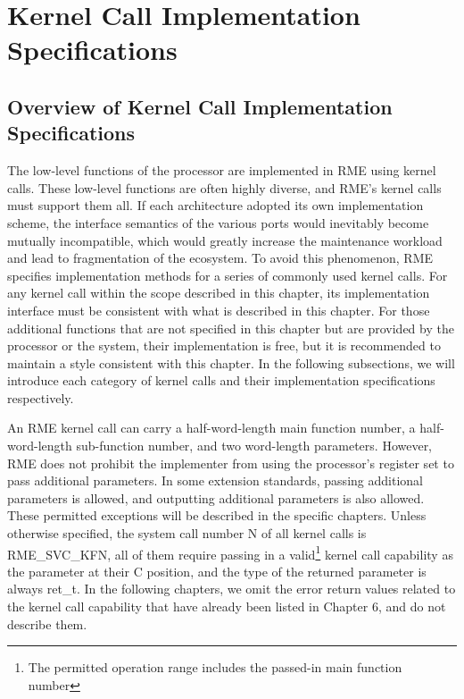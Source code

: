 \chapter{Kernel Call Implementation Specifications}\label{ch:kernel-call-implementation-specification}

\section{Overview of Kernel Call Implementation Specifications}\label{sec:8-kernel-call-implementation-overview}

The low-level functions of the processor are implemented in RME using kernel calls. These low-level functions are often highly diverse, and RME's kernel calls must support them all. If each architecture adopted its own implementation scheme, the interface semantics of the various ports would inevitably become mutually incompatible, which would greatly increase the maintenance workload and lead to fragmentation of the ecosystem. To avoid this phenomenon, RME specifies implementation methods for a series of commonly used kernel calls. For any kernel call within the scope described in this chapter, its implementation interface must be consistent with what is described in this chapter. For those additional functions that are not specified in this chapter but are provided by the processor or the system, their implementation is free, but it is recommended to maintain a style consistent with this chapter. In the following subsections, we will introduce each category of kernel calls and their implementation specifications respectively.

An RME kernel call can carry a half-word-length main function number, a half-word-length sub-function number, and two word-length parameters. However, RME does not prohibit the implementer from using the processor's register set to pass additional parameters. In some extension standards, passing additional parameters is allowed, and outputting additional parameters is also allowed. These permitted exceptions will be described in the specific chapters. Unless otherwise specified, the system call number N of all kernel calls is RME\_SVC\_KFN, all of them require passing in a valid\footnote{The permitted operation range includes the passed-in main function number} kernel call capability as the parameter at their C position, and the type of the returned parameter is always ret\_t. In the following chapters, we omit the error return values related to the kernel call capability that have already been listed in Chapter 6, and do not describe them.

